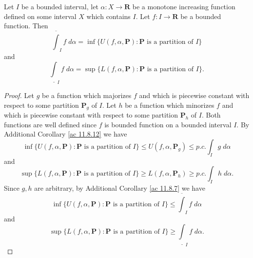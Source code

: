 \begin{additional corollary}\label{ac 11.8.13}
Let \(I\) be a bounded interval, let \(\alpha : X \to \mathbf{R}\) be a monotone increasing function defined on some interval \(X\) which contains \(I\).
Let \(f : I \to \mathbf{R}\) be a bounded function.
Then
\[
    \overline{\int}_I f \; d \alpha = \inf\{U(f, \alpha, \mathbf{P}) : \mathbf{P} \text{ is a partition of } I\}
\]
and
\[
    \underline{\int}_I f \; d \alpha = \sup\{L(f, \alpha, \mathbf{P}) : \mathbf{P} \text{ is a partition of } I\}.
\]
\end{additional corollary}

\begin{proof}
    Let \(g\) be a function which majorizes \(f\) and which is piecewise constant with respect to some partition \(\mathbf{P}_g\) of \(I\).
    Let \(h\) be a function which minorizes \(f\) and which is piecewise constant with respect to some partition \(\mathbf{P}_h\) of \(I\).
    Both functions are well defined since \(f\) is bounded function on a bounded interval \(I\).
    By Additional Corollary \ref{ac 11.8.12} we have
    \[
        \inf\big\{U(f, \alpha, \mathbf{P}) : \mathbf{P} \text{ is a partition of } I\big\} \leq U(f, \alpha, \mathbf{P}_g) \leq p.c. \int_I g \; d \alpha
    \]
    and
    \[
        \sup\big\{L(f, \alpha, \mathbf{P}) : \mathbf{P} \text{ is a partition of } I\big\} \geq L(f, \alpha, \mathbf{P}_h) \geq p.c. \int_I h \; d \alpha.
    \]
    Since \(g, h\) are arbitrary, by Additional Corollary \ref{ac 11.8.7} we have
    \[
        \inf\big\{U(f, \alpha, \mathbf{P}) : \mathbf{P} \text{ is a partition of } I\big\} \leq \overline{\int}_I f \; d \alpha
    \]
    and
    \[
        \sup\big\{L(f, \alpha, \mathbf{P}) : \mathbf{P} \text{ is a partition of } I\big\} \geq \underline{\int}_I f \; d \alpha.
    \]


\end{proof}

